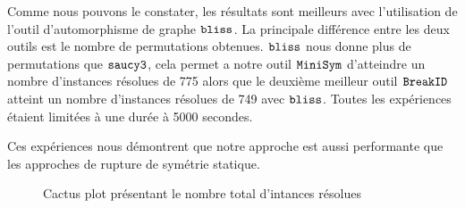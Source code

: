 Comme nous pouvons le constater, les résultats sont meilleurs  avec l'utilisation de l'outil d'automorphisme de 
graphe $\texttt{bliss}$. La principale différence entre les deux outils est le nombre de permutations obtenues.
$\texttt{bliss}$ nous donne plus de permutations que $\texttt{saucy3}$, cela permet a notre outil $\texttt{MiniSym}$ d'atteindre 
un nombre d'instances résolues de 775 alors que le deuxième meilleur outil $\texttt{BreakID}$ atteint un nombre d'instances résolues de 749 avec $\texttt{bliss}$. Toutes les expériences étaient limitées à une durée à 5000 secondes.

Ces expériences nous démontrent que notre approche est aussi performante que les approches de rupture de symétrie statique.
\begin{figure}[!htbp]
	\centering
	\qquad
	\caption{Cactus plot  présentant le nombre total d'intances résolues}%
	\label{fig:frcactus}%
\end{figure}

